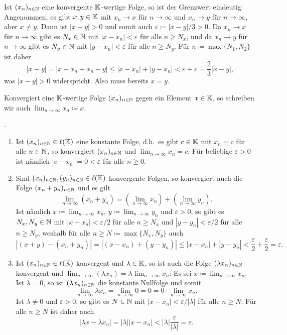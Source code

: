 \begin{bem}
 Ist $(x_n)_{n \in \mathbb{N}}$ eine konvergente $\mathbb{K}$-wertige Folge, so ist der Grenzwert eindeutig: Angenommen, es gibt $x,y \in \mathbb{K}$ mit $x_n \to x$ für $n \to \infty$ und $x_n \to y$ für $n \to \infty$, aber $x \neq y$. Dann ist $|x-y| > 0$ und somit auch $\varepsilon \coloneqq |x-y|/3 > 0$. Da $x_n \to x$ für $n \to \infty$ gibt es $N_x \in \mathbb{N}$ mit $|x-x_n| < \varepsilon$ für alle $n \geq N_x$, und da $x_n \to y$ für $n \to \infty$ gibt es $N_y \in \mathbb{N}$ mit $|y-x_n| < \varepsilon$ für alle $n \geq N_y$. Für $n \coloneqq \max \{N_1, N_2\}$ ist daher
 \[
  |x-y|
  = |x-x_n+x_n-y|
  \leq |x - x_n| + |y - x_n|
  < \varepsilon + \varepsilon
  = \frac{2}{3}|x-y|,
 \]
 was $|x-y| > 0$ widerspricht. Also muss bereits $x = y$.
 
 Konvergiert eine $\mathbb{K}$-wertige Folge $(x_n)_{n \in \mathbb{N}}$ gegen ein Element $x \in \mathbb{K}$, so schreiben wir auch $\lim_{n \to \infty} x_n \coloneqq x$.
\end{bem}


\begin{bem}\label{bem: properties of convergent sequences}.
 \begin{enumerate}[leftmargin=*]
  \item
   Ist $(x_n)_{n \in \mathbb{N}} \in \ell(\mathbb{K})$ eine konstante Folge, d.h.\ es gibt $c \in \mathbb{K}$ mit $x_n = c$ für alle $n \in \mathbb{N}$, so konvergiert $(x_n)_{n \in \mathbb{N}}$ und $\lim_{n \to \infty} x_n = c$. Für beliebige $\varepsilon > 0$ ist nämlich $|c-x_n| = 0 < \varepsilon$ für alle $n \geq 0$.
  \item
   Sind $(x_n)_{n \in \mathbb{N}}, (y_n)_{n \in \mathbb{N}} \in \ell(\mathbb{K})$ konvergente Folgen, so konvergiert auch die Folge $(x_n + y_n)_{n \in \mathbb{N}}$ und es gilt
   \[
    \lim_{n \to \infty} (x_n + y_n)
    = \left( \lim_{n \to \infty} x_n \right) + \left( \lim_{n \to \infty} y_n \right).
   \]
   Ist nämlich $x \coloneqq \lim_{n \to \infty} x_n$, $y \coloneqq \lim_{n \to \infty} y_n$ und $\varepsilon > 0$, so gibt es $N_x, N_y \in \mathbb{N}$ mit $|x-x_n| < \varepsilon/2$ für alle $n \geq N_x$ und $|y-y_n| < \varepsilon/2$ für alle $n \geq N_y$, weshalb für alle $n \geq N \coloneqq \max\{N_x, N_y\}$ auch
   \[
    |(x+y)-(x_n+y_n)|
    = |(x-x_n) + (y-y_n)|
    \leq |x - x_n| + |y - y_n|
    < \frac{\varepsilon}{2} + \frac{\varepsilon}{2}
    = \varepsilon.
   \]
  \item
   Ist $(x_n)_{n \in \mathbb{N}} \in \ell(\mathbb{K})$ konvergent und $\lambda \in \mathbb{K}$, so ist auch die Folge $(\lambda x_n)_{n \in \mathbb{N}}$ konvergent und $\lim_{n \to \infty} (\lambda x_n) = \lambda \lim_{n \to \infty} x_n$: Es sei $x \coloneqq \lim_{n \to \infty} x_n$. Ist $\lambda = 0$, so ist $(\lambda x_n)_{n \in \mathbb{N}}$ die konstante Nullfolge und somit
   \[
    \lim_{n \to \infty} \lambda x_n
    = \lim_{n \to \infty} 0
    = 0
    = 0 \cdot \lim_{n \to \infty} x_n.
   \]
   Ist $\lambda \neq 0$ und $\varepsilon > 0$, so gibt es $N \in \mathbb{N}$ mit $|x-x_n| < \varepsilon/|\lambda|$ für alle $n \geq N$. Für alle $n \geq N$ ist daher auch
   \[
    |\lambda x - \lambda x_n|
    = |\lambda| |x-x_n|
    < |\lambda| \frac{\varepsilon}{|\lambda|}
    = \varepsilon.
   \]
 \end{enumerate}
\end{bem}


